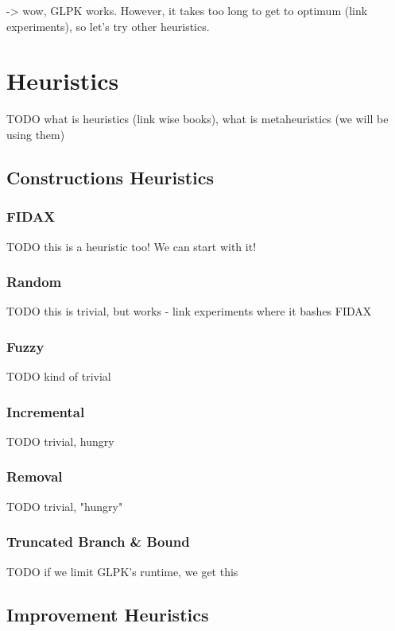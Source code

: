 \documentclass[a4paper,12pt,oneside]{report}
\begin{document}
 -> wow, GLPK works. However, it takes too long to get to optimum (link experiments), so let's try other heuristics.
 
\section{Heuristics}

TODO what is heuristics (link wise books), what is metaheuristics (we will be using them)

\subsection{Constructions Heuristics}

\subsubsection{FIDAX}

TODO this is a heuristic too! We can start with it!

\subsubsection{Random}

TODO this is trivial, but works - link experiments where it bashes FIDAX

\subsubsection{Fuzzy}

TODO kind of trivial

\subsubsection{Incremental}

TODO trivial, hungry

\subsubsection{Removal}

TODO trivial, "hungry"

\subsubsection{Truncated Branch & Bound}

TODO if we limit GLPK's runtime, we get this 

\subsection{Improvement Heuristics}
\end{document}
